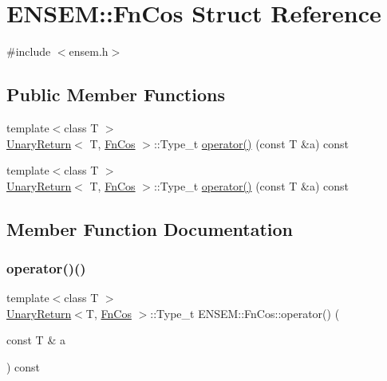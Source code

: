 \hypertarget{structENSEM_1_1FnCos}{}\section{E\+N\+S\+EM\+:\+:Fn\+Cos Struct Reference}
\label{structENSEM_1_1FnCos}


{\ttfamily \#include $<$ensem.\+h$>$}

\subsection*{Public Member Functions}
\begin{DoxyCompactItemize}
\item 
{\footnotesize template$<$class T $>$ }\\\mbox{\hyperlink{structENSEM_1_1UnaryReturn}{Unary\+Return}}$<$ T, \mbox{\hyperlink{structENSEM_1_1FnCos}{Fn\+Cos}} $>$\+::Type\+\_\+t \mbox{\hyperlink{structENSEM_1_1FnCos_a446b9cdd3e854285292e8159b45b0a58}{operator()}} (const T \&a) const
\item 
{\footnotesize template$<$class T $>$ }\\\mbox{\hyperlink{structENSEM_1_1UnaryReturn}{Unary\+Return}}$<$ T, \mbox{\hyperlink{structENSEM_1_1FnCos}{Fn\+Cos}} $>$\+::Type\+\_\+t \mbox{\hyperlink{structENSEM_1_1FnCos_a446b9cdd3e854285292e8159b45b0a58}{operator()}} (const T \&a) const
\end{DoxyCompactItemize}


\subsection{Member Function Documentation}
\mbox{\label{structENSEM_1_1FnCos_a446b9cdd3e854285292e8159b45b0a58}} 
\subsubsection{\texorpdfstring{operator()()}{operator()()}\hspace{0.1cm}{\footnotesize\ttfamily [1/2]}}
{\footnotesize\ttfamily template$<$class T $>$ \\
\mbox{\hyperlink{structENSEM_1_1UnaryReturn}{Unary\+Return}}$<$T, \mbox{\hyperlink{structENSEM_1_1FnCos}{Fn\+Cos}} $>$\+::Type\+\_\+t E\+N\+S\+E\+M\+::\+Fn\+Cos\+::operator() (\begin{DoxyParamCaption}\item[{const T \&}]{a }\end{DoxyParamCaption}) const\hspace{0.3cm}{\ttfamily [inline]}}

